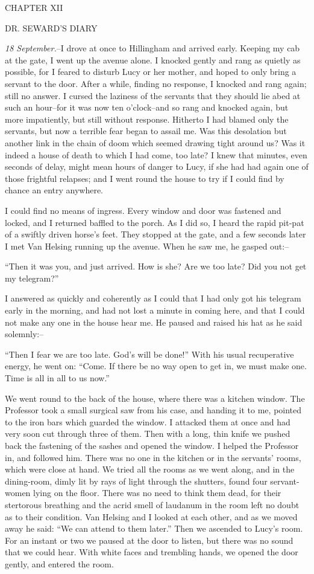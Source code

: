 \documentclass[12pt,openright]{book}
\begin{document}
CHAPTER XII

DR. SEWARD’S DIARY

\textit{18 September.}–I drove at once to Hillingham and arrived early. Keeping my cab at the gate, I went up the avenue alone. I knocked gently and rang as quietly as possible, for I feared to disturb Lucy or her mother, and hoped to only bring a servant to the door. After a while, finding no response, I knocked and rang again; still no answer. I cursed the laziness of the servants that they should lie abed at such an hour–for it was now ten o’clock–and so rang and knocked again, but more impatiently, but still without response. Hitherto I had blamed only the servants, but now a terrible fear began to assail me. Was this desolation but another link in the chain of doom which seemed drawing tight around us? Was it indeed a house of death to which I had come, too late? I knew that minutes, even seconds of delay, might mean hours of danger to Lucy, if she had had again one of those frightful relapses; and I went round the house to try if I could find by chance an entry anywhere.

I could find no means of ingress. Every window and door was fastened and locked, and I returned baffled to the porch. As I did so, I heard the rapid pit-pat of a swiftly driven horse’s feet. They stopped at the gate, and a few seconds later I met Van Helsing running up the avenue. When he saw me, he gasped out:–

“Then it was you, and just arrived. How is she? Are we too late? Did you not get my telegram?”

I answered as quickly and coherently as I could that I had only got his telegram early in the morning, and had not lost a minute in coming here, and that I could not make any one in the house hear me. He paused and raised his hat as he said solemnly:–

“Then I fear we are too late. God’s will be done!” With his usual recuperative energy, he went on: “Come. If there be no way open to get in, we must make one. Time is all in all to us now.”

We went round to the back of the house, where there was a kitchen window. The Professor took a small surgical saw from his case, and handing it to me, pointed to the iron bars which guarded the window. I attacked them at once and had very soon cut through three of them. Then with a long, thin knife we pushed back the fastening of the sashes and opened the window. I helped the Professor in, and followed him. There was no one in the kitchen or in the servants’ rooms, which were close at hand. We tried all the rooms as we went along, and in the dining-room, dimly lit by rays of light through the shutters, found four servant-women lying on the floor. There was no need to think them dead, for their stertorous breathing and the acrid smell of laudanum in the room left no doubt as to their condition. Van Helsing and I looked at each other, and as we moved away he said: “We can attend to them later.” Then we ascended to Lucy’s room. For an instant or two we paused at the door to listen, but there was no sound that we could hear. With white faces and trembling hands, we opened the door gently, and entered the room.
\end{document}
